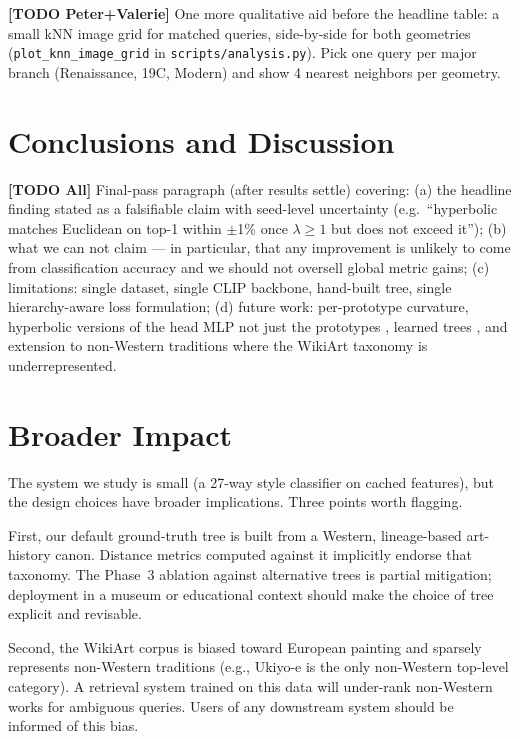 \documentclass[11pt]{article}
\newcommand{\TODO}[2]{\textcolor{red!70!black}{\textbf{[TODO #1]} #2}}
\begin{document}
\TODO{Peter+Valerie}{One more qualitative aid before the headline table:
a small kNN image grid for matched queries, side-by-side for both
geometries (\texttt{plot\_knn\_image\_grid} in
\texttt{scripts/analysis.py}). Pick one query per major branch
(Renaissance, 19C, Modern) and show 4 nearest neighbors per geometry.}

\section{Conclusions and Discussion} %

\TODO{All}{Final-pass paragraph (after results settle) covering:
(a) the headline finding stated as a falsifiable claim with seed-level
uncertainty (e.g.\ ``hyperbolic matches Euclidean on top-1 within $\pm$1\%
once $\lambda \geq 1$ but does not exceed it''); (b) what we can not claim
--- in particular, that any improvement is unlikely to come from
classification accuracy and we should not oversell global metric gains;
(c) limitations: single dataset, single CLIP backbone, hand-built tree,
single hierarchy-aware loss formulation; (d) future work: per-prototype
curvature, hyperbolic versions of the head MLP not just the prototypes
\citep{ganea2018hyperbolic}, learned trees \citep{chami2020trees}, and
extension to non-Western traditions where the WikiArt taxonomy is
underrepresented.}

\section{Broader Impact} %

The system we study is small (a 27-way style classifier on cached features),
but the design choices have broader implications. Three points worth
flagging.

First, our default ground-truth tree is built from a Western, lineage-based
art-history canon. Distance metrics computed against it implicitly endorse
that taxonomy. The Phase~3 ablation against alternative trees is partial
mitigation; deployment in a museum or educational context should make the
choice of tree explicit and revisable.

Second, the WikiArt corpus is biased toward European painting and sparsely
represents non-Western traditions (e.g., Ukiyo-e is the only non-Western
top-level category). A retrieval system trained on this data will under-rank
non-Western works for ambiguous queries. Users of any downstream system
should be informed of this bias.
\end{document}
